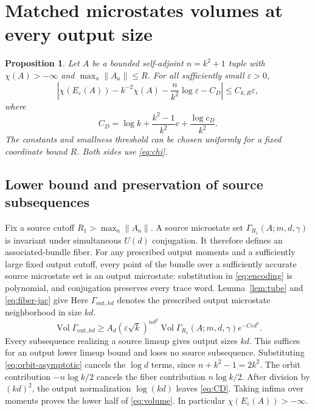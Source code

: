 \documentclass[11pt]{article}
\newtheorem{proposition}[theorem]{Proposition}
\theoremstyle{definition}\newtheorem{definition}[theorem]{Definition}
\theoremstyle{remark}\newtheorem{remark}[theorem]{Remark}
\DeclareMathOperator{\Vol}{Vol}\DeclareMathOperator{\rank}{rank}
\newcommand{\eps}{\varepsilon}\newcommand{\id}{\mathrm{id}}
\begin{document}
\section{Matched microstates volumes at every output size}
\label{sec:volume}
\begin{proposition}\label{prop:volume}
Let $A$ be a bounded self-adjoint $n=k^2+1$ tuple with $\chi(A)>-\infty$
and $\max_a\|A_a\|\leq R$. For all sufficiently small $\eps>0$,
\begin{equation}\label{eq:volume}
 \left|\chi(E_\eps(A))-k^{-2}\chi(A)
       -\frac n{k^2}\log\eps-C_D\right|\leq C_{k,R}\eps,
\end{equation}
where
\begin{equation}\label{eq:CD}
 C_D=\log k+\frac{k^2-1}{k^2}c+\frac{\log c_D}{k^2}.
\end{equation}
The constants and smallness threshold can be chosen uniformly for a
fixed coordinate bound $R$. Both sides use \eqref{eq:chi}.
\end{proposition}

\subsection{Lower bound and preservation of source subsequences}
Fix a source cutoff $R_1>\max_a\|A_a\|$. A source microstate set
$\Gamma_{R_1}(A;m,d,\gamma)$ is invariant under simultaneous $U(d)$
conjugation. It therefore defines an associated-bundle fiber.
For any prescribed output moments and a sufficiently large fixed output
cutoff, every point of the bundle over a sufficiently accurate source
microstate set is an output microstate: substitution in
\eqref{eq:encoding} is polynomial, and conjugation preserves every
trace word. Lemma~\ref{lem:tube} and \eqref{eq:fiber-jac} give
Here $\Gamma_{\mathrm{out},kd}$ denotes the prescribed output
microstate neighborhood in size $kd$.
\begin{equation}\label{eq:lower-volume}
 \Vol\Gamma_{\mathrm{out},kd}
 \geq A_d(\eps\sqrt k)^{nd^2}
       \Vol\Gamma_{R_1}(A;m,d,\gamma)e^{-C\eps d^2}.
\end{equation}
Every subsequence realizing a source limsup gives output sizes $kd$.
This suffices for an output lower limsup bound and loses no source
subsequence. Substituting \eqref{eq:orbit-asymptotic} cancels the
$\log d$ terms, since $n+k^2-1=2k^2$. The orbit contribution
$-n\log k/2$ cancels the fiber contribution $n\log k/2$.
After division by $(kd)^2$, the output normalization $\log(kd)$ leaves
\eqref{eq:CD}. Taking infima over moments proves the lower half of
\eqref{eq:volume}. In particular $\chi(E_\eps(A))> -\infty$.
\end{document}
